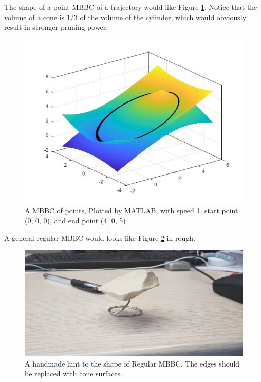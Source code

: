 \documentclass[sigplan]{acmart}
\begin{document}
The shape of a point MBBC of a trajectory would like Figure \ref{fig:matlab}. Notice that the volume of a cone is 1/3 of the volume of the cylinder, which would obviously result in stronger pruning power. \\
\begin{figure}[ht]
  \centering
  \includegraphics[width=\linewidth]{matlab.jpg}
  \caption{A MBBC of points, Plotted by MATLAB, with speed 1, start point (0, 0, 0), and end point (4, 0, 5)}
  \label{fig:matlab}
\end{figure}

A general regular MBBC would looks like Figure \ref{fig:generalmbbc} in rough.
\begin{figure}[ht]
  \centering
  \includegraphics[width=\linewidth]{generalmbbc.jpg}
  \caption{A handmade hint to the shape of Regular MBBC. The edges should be replaced with cone surfaces.}
  \label{fig:generalmbbc}
\end{figure}
\end{document}
